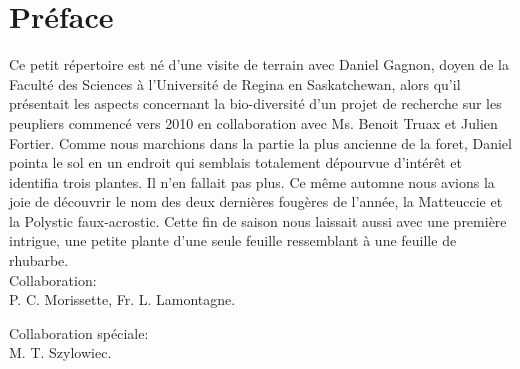 \chapter*{Préface}

Ce petit répertoire est né d'une visite
de terrain avec Daniel Gagnon, doyen de la Faculté des Sciences à l’Université de Regina en Saskatchewan, alors qu'il
présentait les aspects concernant la bio-diversité
d'un projet de recherche sur les peupliers commencé
vers 2010 en collaboration avec Ms. Benoit Truax
et Julien Fortier.
Comme nous marchions dans la partie la plus ancienne de la foret,
Daniel pointa le sol en un endroit qui semblais
totalement dépourvue d'intérêt et identifia trois plantes.
Il n'en fallait pas plus.
Ce même automne nous avions la joie de découvrir
le nom des deux dernières fougères de l'année,
la Matteuccie et la Polystic faux-acrostic.
Cette fin de saison nous laissait aussi avec
une première intrigue, une petite plante d'une seule feuille ressemblant à une feuille de rhubarbe. \\
	
Collaboration:\\
P. C. Morissette,
Fr. L. Lamontagne.
	
Collaboration spéciale:\\  
M. T. Szylowiec.
